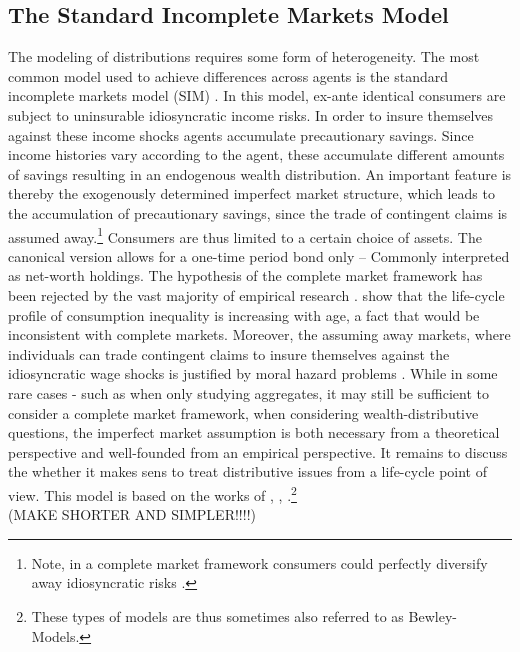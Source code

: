 \documentclass[a4paper,12pt]{article}
\begin{document}
\subsection{The Standard Incomplete Markets Model}
The modeling of distributions requires some form of heterogeneity. The most common model used to achieve differences across agents is the standard incomplete markets model (SIM)   \citep{heathcote2009quantitative}. In this model, ex-ante identical consumers are subject to uninsurable idiosyncratic income risks. In order to insure themselves against these income shocks agents accumulate precautionary savings. Since income histories vary according to the agent, these accumulate different amounts of savings resulting in an endogenous wealth distribution. An important feature is thereby the exogenously determined imperfect market structure, which leads to the accumulation of precautionary savings, since the trade of contingent claims is assumed away.\footnote{Note, in a complete market framework consumers could perfectly diversify away idiosyncratic risks \citep{a&w2010}.} Consumers are thus limited to a certain choice of assets. The canonical version allows for a one-time period bond only \--- Commonly interpreted as net-worth holdings. The hypothesis of the complete market framework has been rejected by the vast majority of empirical research \citep{a&w2010}. \cite{deaton1994} show that the life-cycle profile of consumption inequality is increasing with age, a fact that would be inconsistent with complete markets. Moreover, the assuming away markets, where individuals can trade contingent claims to insure themselves against the idiosyncratic wage shocks is justified by moral hazard problems \citep{FV&K2011}. While in some rare cases - such as when only studying aggregates, it may still be sufficient to consider a complete market framework, when considering wealth-distributive questions, the imperfect market assumption is both necessary from a theoretical perspective and well-founded from an empirical perspective. It remains to discuss the whether it makes sens to treat distributive issues from a life-cycle point of view.
This model is based on the works of \cite{bewley1977permanent}, \cite{aiyagari1994}, \cite{huggett1993risk}.\footnote{These types of models are thus sometimes also referred to as Bewley-Models.} \\

(MAKE SHORTER AND SIMPLER!!!!)
\end{document}
